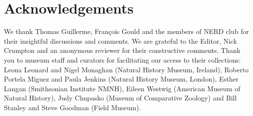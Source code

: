 \documentclass[12pt,a4paper]{article}
\begin{document}
\section{Acknowledgements}
	We thank Thomas Guillerme, Fran\c{c}ois Gould and the members of NERD club for their insightful discussions and comments. We are grateful to the Editor, Nick Crumpton and an anonymous reviewer for their constructive comments. Thank you to museum staff and curators for facilitating our access to their collections: Leona Leonard and Nigel Monaghan (Natural History Museum, Ireland), Roberto Portela Miguez and Paula Jenkins (Natural History Museum, London), Esther Langan (Smithsonian Institute NMNH), Eileen Westwig (American Museum of Natural History), Judy Chupasko (Museum of Comparative Zoology) and Bill Stanley and Steve Goodman (Field Museum).


 
 
\end{document}
